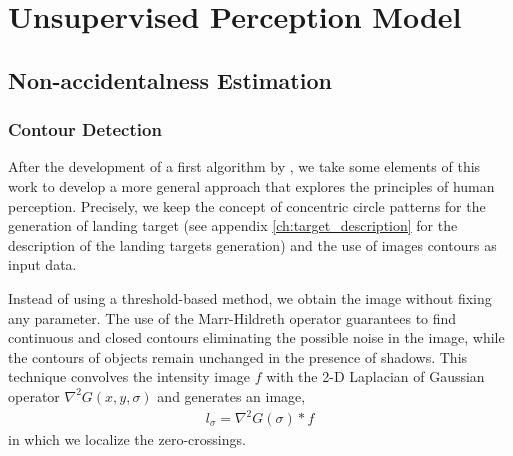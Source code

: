 \section{Unsupervised Perception Model}\label{sec:unsupervised_perception_model}
%
\subsection{Non-accidentalness Estimation}\label{subsec:Helmholtz}

\subsubsection{Contour Detection}\label{subsubsec:muiltiscale}

After the development of a first algorithm by \citep{BaquedanoA.:ESIEE:2017}, we take some elements of this work to develop a more general approach that explores the principles of human perception. Precisely, we keep the concept of concentric circle patterns for the generation of landing target (see appendix \ref{ch:target_description} for the description of the landing targets generation) and the use of images contours as input data.

Instead of using a threshold-based method, we obtain the image without fixing any parameter. The use of the Marr-Hildreth \citep{Marr.Hildreth:PRS:1980} operator guarantees to find continuous and closed contours eliminating the possible noise in the image, while the contours of objects remain unchanged in the presence of shadows. This technique convolves the intensity image $f$ with the 2-D Laplacian of Gaussian operator $\nabla^{2} G(x, y,\sigma)$ and generates an image, 
\begin{eqnarray}\label{eq:LoG}
l_\sigma =  \nabla^{2} G(\sigma)\ast f
\end{eqnarray}
in which we localize the zero-crossings. 

